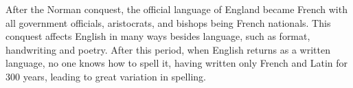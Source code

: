 \documentclass[12pt]{report}
\begin{document}
After the Norman conquest, the official language of England became French with
all government officials, aristocrats, and bishops being French nationals. This
conquest affects English in many ways besides language, such as format,
handwriting and poetry. After this period, when English returns as a written
language, no one knows how to spell it, having written only French and Latin for
300 years, leading to great variation in spelling.
\end{document}
